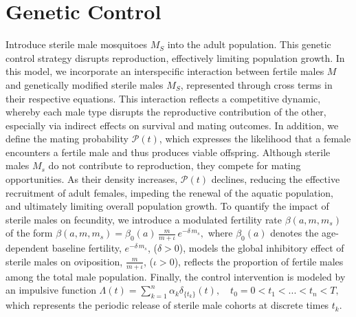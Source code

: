 \documentclass[10pt, a4paper]{amsart}
\theoremstyle{plain}
\theoremstyle{definition}
\theoremstyle{remark}
\numberwithin{equation}{section}
\begin{document}
\section*{\bf Genetic Control}\label{s322} 
Introduce sterile male mosquitoes \( M_S \) into the adult population. This genetic control strategy disrupts reproduction, effectively limiting population growth.  In this model, we incorporate an interspecific interaction between fertile males $M$ and genetically modified sterile males $M_S$, represented through cross terms in their respective equations. This interaction reflects a competitive dynamic, whereby each male type disrupts the reproductive contribution of the other, especially via indirect effects on survival and mating outcomes. In addition, we define the mating probability $\mathcal{P}(t)$, which expresses the likelihood that a female encounters a fertile male and thus produces viable offspring. Although sterile males $M_s$ do not contribute to reproduction, they compete for mating opportunities. As their density increases, $\mathcal{P}(t)$ declines, reducing the effective recruitment of adult females, impeding the renewal of the aquatic population, and ultimately limiting overall population growth. To quantify the impact of sterile males on fecundity, we introduce a modulated fertility rate $\beta(a, m, m_s)$ of the form $ \beta(a, m, m_s) = \beta_0(a)\, \frac{m}{m + \iota}\, e^{-\delta\, m_s},$ where $\beta_0(a)$ denotes the age-dependent baseline fertility,  $e^{-\delta\, m_s}$, ($\delta > 0$), models the global inhibitory effect of sterile males on oviposition, $\frac{m}{m + \iota}$, ($\iota > 0$), reflects the proportion of fertile males among the total male population. Finally, the control intervention is modeled by an impulsive function $\Lambda(t)=\displaystyle\sum_{k=1}^n\alpha_k\delta_{\lbrace t_k\rbrace}(t),\quad t_0=0<t_1<...<t_n<T,$ which represents the periodic release of sterile male cohorts at discrete times $t_k$.
\end{document}
